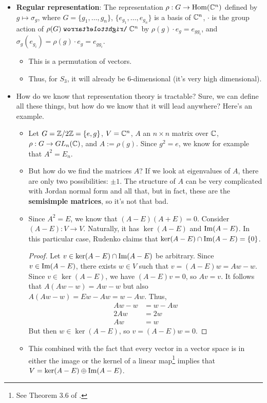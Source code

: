 \documentclass[../notes.tex]{subfiles}
\begin{document}
\begin{itemize}
\begin{itemize}
    \end{itemize}
    \item \textbf{Regular representation}: The representation $\rho:G\to\operatorname{Hom}(\mathbb{C}^n)$ defined by $g\mapsto\sigma_g$, where $G=\{g_1,\dots,g_n\}$, $\{e_{g_1},\dots,e_{g_n}\}$ is a basis of $\mathbb{C}^n$, $\cdot$ is the group action of $\rho(G)\acts\C^n$ by $\rho(g)\cdot e_g=e_{gg_i}$, and $\sigma_g(e_{g_i})=\rho(g)\cdot e_g=e_{gg_i}$.
    \begin{itemize}
        \item This is a permutation of vectors.
        \item Thus, for $S_3$, it will already be 6-dimensional (it's very high dimensional).
    \end{itemize}
    \item How do we know that representation theory is tractable? Sure, we can define all these things, but how do we know that it will lead anywhere? Here's an example.
    \begin{itemize}
        \item Let $G=\mathbb{Z}/2\mathbb{Z}=\{e,g\}$, $V=\mathbb{C}^n$, $A$ an $n\times n$ matrix over $\mathbb{C}$, $\rho:G\to GL_n(\mathbb{C})$, and $A:=\rho(g)$. Since $g^2=e$, we know for example that $A^2=E_n$.
        \item But how do we find the matrices $A$?
        If we look at eigenvalues of $A$, there are only two possibilities: $\pm 1$. The structure of $A$ can be very complicated with Jordan normal form and all that, but in fact, these are the \textbf{semisimple matrices}, so it's not that bad.
        \item Since $A^2=E$, we know that $(A-E)(A+E)=0$. Consider $(A-E):V\to V$. Naturally, it has $\ker(A-E)$ and $\operatorname{Im}(A-E)$. In this particular case, Rudenko claims that $\ker(A-E)\cap\operatorname{Im}(A-E)=\{0\}$.
        \begin{proof}
            Let $v\in\ker(A-E)\cap\operatorname{Im}(A-E)$ be arbitrary. Since $v\in\operatorname{Im}(A-E)$, there exists $w\in V$ such that $v=(A-E)w=Aw-w$. Since $v\in\ker(A-E)$, we have $(A-E)v=0$, so $Av=v$. It follows that $A(Aw-w)=Aw-w$ but also $A(Aw-w)=Ew-Aw=w-Aw$. Thus,
            \begin{align*}
                Aw-w &= w-Aw\\
                2Aw &= 2w\\
                Aw &= w
            \end{align*}
            But then $w\in\ker(A-E)$, so $v=(A-E)w=0$.
        \end{proof}
        \item This combined with the fact that every vector in a vector space is in either the image or the kernel of a linear map\footnote{See Theorem 3.6 of \textcite{bib:Axler}.} implies that $V=\ker(A-E)\oplus\operatorname{Im}(A-E)$.

\end{itemize}
\end{itemize}
\end{document}
